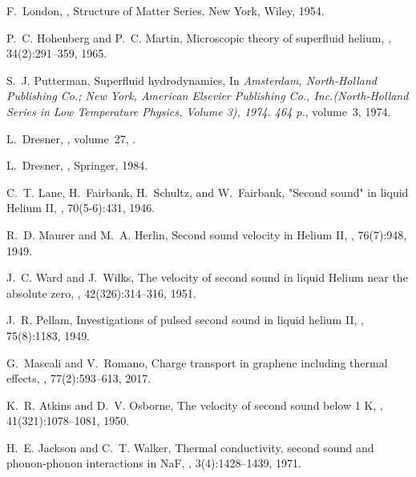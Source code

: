 \documentclass[sn-mathphys]{sn-jnl}%
\theoremstyle{thmstyleone}%
\theoremstyle{thmstyletwo}%
\theoremstyle{thmstylethree}%
\begin{document}
\begin{thebibliography}{9}
	F.~London,
	,
	\newblock Structure of Matter Series. New York, Wiley, 1954.
	
	P.~C. Hohenberg and P.~C. Martin,
	\newblock Microscopic theory of superfluid helium,
	, 34(2):291--359, 1965.
	
	S.~J. Putterman,
	\newblock Superfluid hydrodynamics,
	\newblock In {\em Amsterdam, North-Holland Publishing Co.; New York, American
		Elsevier Publishing Co., Inc.(North-Holland Series in Low Temperature
		Physics. Volume 3), 1974. 464 p.}, volume~3, 1974.
	
	L.~Dresner,
	, volume~27,
	.
	
	L.~Dresner,
	,
	\newblock Springer, 1984.
	
	C.~T. Lane, H.~Fairbank, H.~Schultz, and W.~Fairbank,
	\newblock "{S}econd sound" in liquid {H}elium {II},
	, 70(5-6):431, 1946.
	
	R.~D. Maurer and M.~A. Herlin,
	\newblock Second sound velocity in {H}elium {II},
	, 76(7):948, 1949.
	
	J.~C. Ward and J.~Wilks,
	\newblock The velocity of second sound in liquid {H}elium near the absolute
	zero,
	, 42(326):314--316, 1951.
	
	J.~R. Pellam,
	\newblock Investigations of pulsed second sound in liquid helium {II},
	, 75(8):1183, 1949.
	
	G.~Mascali and V.~Romano,
	\newblock Charge transport in graphene including thermal effects,
	, 77(2):593--613, 2017.
	
	K.~R. Atkins and D.~V. Osborne,
	\newblock The velocity of second sound below 1 {K},
	, 41(321):1078--1081, 1950.
	
	H.~E. Jackson and C.~T. Walker,
	\newblock Thermal conductivity, second sound and phonon-phonon interactions in
	{N}a{F},
	, 3(4):1428--1439, 1971.
	

\end{thebibliography}
\end{document}
